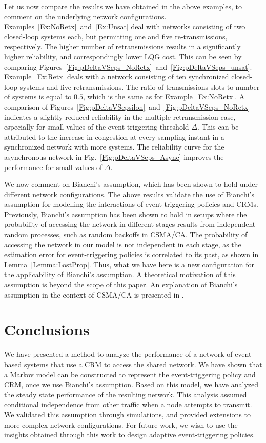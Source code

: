 \documentclass[journal]{IEEEtran}
\begin{document}
Let us now compare the results we have obtained in the above examples, to comment on the underlying network configurations. Examples~\ref{Ex:NoRetx}~and~\ref{Ex:Unsat} deal with networks consisting of two closed-loop systems each, but permitting one and five re-transmissions, respectively. The higher number of retransmissions results in a significantly higher reliability, and correspondingly lower LQG cost. This can be seen by comparing Figures~\ref{Fig:pDeltaVSeps_NoRetx}~and~\ref{Fig:pDeltaVSeps_unsat}. Example~\ref{Ex:Retx} deals with a network consisting of ten synchronized closed-loop systems and five retransmissions. The ratio of transmissions slots to number of systems is equal to $0.5$, which is the same as for Example~\ref{Ex:NoRetx}. A comparison of Figures~\ref{Fig:pDeltaVSepsilon}~and~\ref{Fig:pDeltaVSeps_NoRetx} indicates a slightly reduced reliability in the multiple retransmission case, especially for small values of the event-triggering threshold $\Delta$. This can be attributed to the increase in congestion at every sampling instant in a synchronized network with more systems. The reliability curve for the asynchronous network in Fig.~\ref{Fig:pDeltaVSeps_Async} improves the performance for small values of $\Delta$.

We now comment on Bianchi's assumption, which has been shown to hold under different network configurations. The above results validate the use of Bianchi's assumption for modelling the interactions of event-triggering policies and CRMs. Previously, Bianchi's assumption has been shown to hold in setups where the probability of accessing the network in different stages results from independent random processes, such as random backoffs in CSMA/CA. The probability of accessing the network in our model is not independent in each stage, as the estimation error for event-triggering policies is correlated to its past, as shown in Lemma~\ref{Lemma:LostProp}. Thus, what we have here is a new configuration for the applicability of Bianchi's assumption. A theoretical motivation of this assumption is beyond the scope of this paper. An explanation of Bianchi's assumption in the context of CSMA/CA is presented in \cite{Bordenave2010}.

\section{Conclusions} \label{S:Concl}

We have presented a method to analyze the performance of a network of event-based systems that use a CRM to access the shared network. We have shown that a Markov model can be constructed to represent the event-triggering policy and CRM, once we use Bianchi's assumption. Based on this model, we have analyzed the steady state performance of the resulting network. This analysis assumed conditional independence from other traffic when a node attempts to transmit. We validated this assumption through simulations, and provided extensions to more complex network configurations. For future work, we wish to use the insights obtained through this work to design adaptive event-triggering policies.



\end{document}

